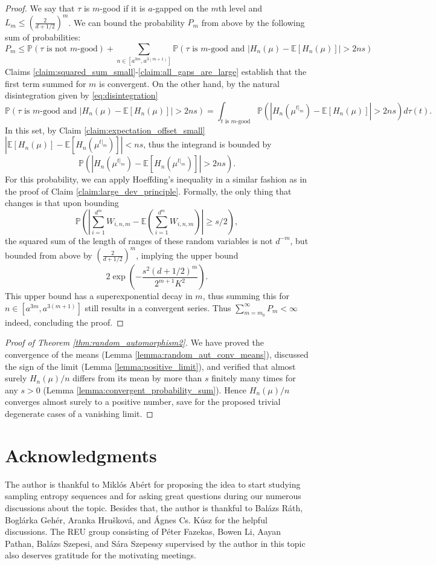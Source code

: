 \documentclass[11pt]{article}
\newcommand{\PP}{\mathbb{P}}
\newcommand{\EE}{\mathbb{E}}
\theoremstyle{definition}
\begin{document}
\begin{proof}
    We say that $\tau$ is $m$-good if it is $a$-gapped on the $m$th level and $L_m\leq\left(\frac{2}{d+1/2}\right)^m$. We can bound the probability $P_m$ from above by the following sum of probabilities:
    $$P_m\leq \PP(\tau\text{ is not $m$-good})+\sum_{n\in [a^{3m}, a^{3(m+1)}]}\PP(\tau\text{ is $m$-good and }|H_n(\mu) - \EE [H_n(\mu)]| >2ns)$$
    Claims \ref{claim:squared_sum_small}-\ref{claim:all_gaps_are_large} establish that the first term summed for $m$ is convergent. On the other hand, by the natural disintegration given by \eqref{eq:disintegration}
    $$\PP(\tau\text{ is $m$-good and }|H_n(\mu) - \EE [H_n(\mu)]| >2ns)=\int_{t\text{ is $m$-good}}\PP(|H_n(\mu^{t|_m}) - \EE [H_n(\mu)]| >2ns)d\tau(t).$$
    In this set, by Claim \ref{claim:expectation_offset_small} $|\EE [H_n(\mu)] - \EE [H_n(\mu^{t|_m})]|<ns$, thus the integrand is bounded by 
    $$\PP(|H_n(\mu^{t|_m}) - \EE [H_n(\mu^{t|_m})]| >2ns).$$
    For this probability, we can apply Hoeffding's inequality in a similar fashion as in the proof of Claim \ref{claim:large_dev_principle}. Formally, the only thing that changes is that upon bounding
    $$\PP\left(\left|\sum_{i=1}^{d^m}W_{i, n, m} - \EE\left(\sum_{i=1}^{d^m}W_{i, n, m}\right)\right|\geq s/2\right),$$
    the squared sum of the length of ranges of these random variables is not $d^{-m}$, but bounded from above by $\left(\frac{2}{d+1/2}\right)^m$, implying the upper bound
    $$2\exp\left(-\frac{s^2(d+1/2)^m}{2^{m+1}K^2}\right).$$
    This upper bound has a superexponential decay in $m$, thus summing this for $n\in [a^{3m}, a^{3(m+1)}]$ still results in a convergent series. Thus  $\sum_{m=m_0}^{\infty}P_m<\infty$ indeed, concluding the proof.
\end{proof}

\begin{proof}[Proof of Theorem \ref{thm:random_automorphism2}]
We have proved the convergence of the means (Lemma \ref{lemma:random_aut_conv_means}), discussed the sign of the limit (Lemma \ref{lemma:positive_limit}), and verified that almost surely $H_n(\mu)/n$ differs from its mean by more than $s$ finitely many times for any $s>0$ (Lemma \ref{lemma:convergent_probability_sum}). Hence $H_n(\mu)/n$ converges almost surely to a positive number, save for the proposed trivial degenerate cases of a vanishing limit.
\end{proof}

\section*{Acknowledgments}
The author is thankful to Miklós Abért for proposing the idea to start studying sampling entropy sequences and for asking great questions during our numerous discussions about the topic. Besides that, the author is thankful to Balázs Ráth, Boglárka Gehér, Aranka Hrušková, and Ágnes Cs. Kúsz for the helpful discussions. The REU group consisting of Péter Fazekas, Bowen Li, Aayan Pathan, Balázs Szepesi, and Sára Szepessy supervised by the author in this topic also deserves gratitude for the motivating meetings.

\printbibliography
\end{document}
